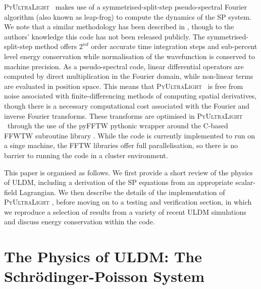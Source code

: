 \documentclass[a4paper,11pt]{article}
\newcommand{\PyUltraLight}{\textsc{PyUltraLight }}
\begin{document}
\PyUltraLight\ makes use of a symmetrised-split-step pseudo-spectral Fourier algorithm (also known as leap-frog) to compute the dynamics of the SP system. We note that a similar methodology has been described in \cite{Paredes2016}, though to the authors' knowledge this code has not been released publicly. The symmetrised-split-step method offers $2^{nd}$ order accurate time integration steps and sub-percent level energy conservation while normalisation of the wavefunction is conserved to machine precision. As a pseudo-spectral code, linear differential operators are computed by direct multiplication in the Fourier domain, while non-linear terms are evaluated in position space. This means that \PyUltraLight\ is free from noise associated with finite-differencing methods of computing spatial derivatives, though there is a necessary computational cost associated with the Fourier and inverse Fourier transforms. These transforms are optimised in \PyUltraLight\ through the use of the pyFFTW pythonic wrapper around the C-based FFWTW subroutine library \cite{pyfftw} \cite{fftw}. While the code is currently implemented to run on a singe machine, the FFTW libraries offer full parallelisation, so there is no barrier to running the code in a cluster environment.  

This paper is organised as follows. We first provide a short review of the physics of ULDM, including a derivation of the SP equations from an appropriate scalar-field Lagrangian. We then describe the details of the implementation of \PyUltraLight, before moving on to a testing and verification section, in which we reproduce a selection of results from a variety of recent ULDM simulations and discuss energy conservation within the code. 


\section{The Physics of ULDM: The Schr{\"o}dinger-Poisson System}\label{sec:physics}
\end{document}
